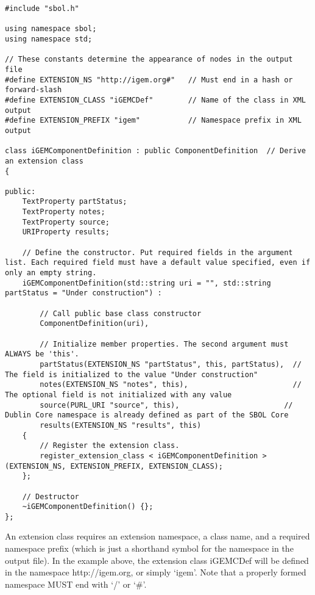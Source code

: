 \vspace{\abovedisplayskip}
\begin{minipage}{0.95\textwidth} 
\begin{lstlisting}
#include "sbol.h"

using namespace sbol;
using namespace std;

// These constants determine the appearance of nodes in the output file
#define EXTENSION_NS "http://igem.org#"   // Must end in a hash or forward-slash
#define EXTENSION_CLASS "iGEMCDef"        // Name of the class in XML output
#define EXTENSION_PREFIX "igem"           // Namespace prefix in XML output

class iGEMComponentDefinition : public ComponentDefinition  // Derive an extension class
{
    
public:
    TextProperty partStatus;
    TextProperty notes;
    TextProperty source;
    URIProperty results;
    
    // Define the constructor. Put required fields in the argument list. Each required field must have a default value specified, even if only an empty string.
    iGEMComponentDefinition(std::string uri = "", std::string partStatus = "Under construction") :
    
        // Call public base class constructor
        ComponentDefinition(uri),
    
        // Initialize member properties. The second argument must ALWAYS be 'this'.
        partStatus(EXTENSION_NS "partStatus", this, partStatus),  // The field is initialized to the value "Under construction"
        notes(EXTENSION_NS "notes", this),                        // The optional field is not initialized with any value
        source(PURL_URI "source", this),                        // Dublin Core namespace is already defined as part of the SBOL Core
        results(EXTENSION_NS "results", this)
    {
        // Register the extension class.
        register_extension_class < iGEMComponentDefinition >(EXTENSION_NS, EXTENSION_PREFIX, EXTENSION_CLASS);
    };
    
    // Destructor
    ~iGEMComponentDefinition() {};
};

\end{lstlisting}
\end{minipage}

An extension class requires an extension namespace, a class name, and a required namespace prefix (which is just a shorthand symbol for the namespace in the output file). In the example above, the extension class iGEMCDef will be defined in the namespace http://igem.org, or simply `igem'. Note that a properly formed namespace MUST end with `/' or `\#'.  

